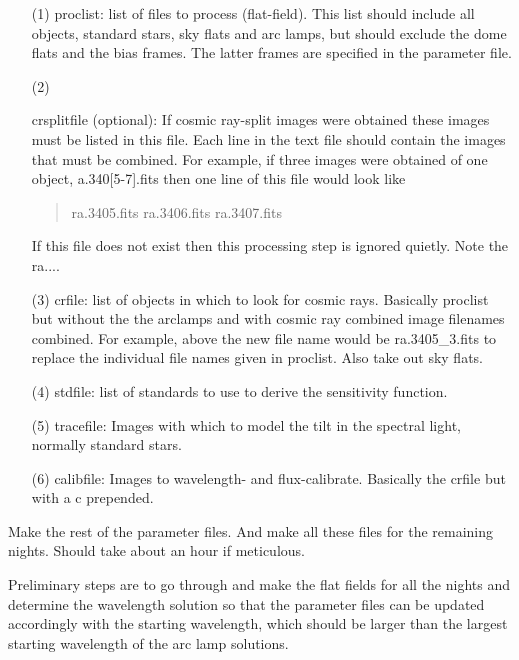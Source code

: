 \documentclass[12pt,preprint]{aastex}
\begin{document}
\begin{enumerate}

\item[(1)]{proclist: list of files to process (flat-field).  This list
should include all objects, standard stars, sky flats and arc lamps,
but should exclude the dome flats and the bias frames.  The latter
frames are specified in the parameter file.}

\item[(2)]{crsplitfile (optional): If cosmic ray-split images were
obtained these images must be listed in this file.  Each line in the
text file should contain the images that must be combined.  For
example, if three images were obtained of one object, a.340[5-7].fits
then one line of this file would look like

\begin{quote}
ra.3405.fits ra.3406.fits ra.3407.fits
\end{quote}

If this file does not exist then this processing step is ignored
quietly.  Note the ra....}

\item[(3)]{crfile: list of objects in which to look for cosmic rays.
Basically proclist but without the the arclamps and with cosmic ray
combined image filenames combined.  For example, above the new file
name would be ra.3405\_3.fits to replace the individual file names
given in proclist.  Also take out sky flats.}

\item[(4)]{stdfile:  list of standards to use to derive the
sensitivity function.}

\item[(5)]{tracefile:  Images with which to model the tilt in the
spectral light, normally standard stars.}  

\item[(6)]{calibfile:  Images to wavelength- and flux-calibrate.
Basically the crfile but with a c prepended.}

\end{enumerate}

Make the rest of the parameter files.  And make all these files for
the remaining nights.  Should take about an hour if meticulous.

Preliminary steps are to go through and make the flat fields for all
the nights and determine the wavelength solution so that the parameter
files can be updated accordingly with the starting wavelength, which
should be larger than the largest starting wavelength of the arc lamp
solutions. 
\end{document}

